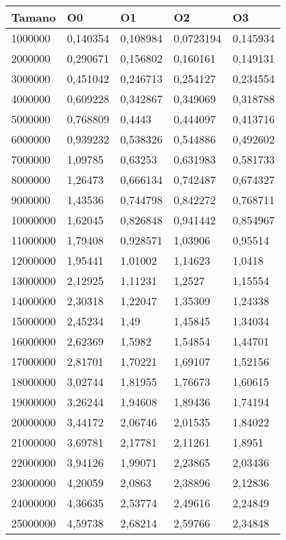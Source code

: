 \begin{tabular}{|l|l|l|l|l|}
	\hline
	Tamano & O0 & O1 & O2 & O3 \\
	\hline
	\hline
	1000000 & 0,140354 & 0,108984 & 0,0723194 & 0,145934 \\
	\hline
	2000000 & 0,290671 & 0,156802 & 0,160161 & 0,149131 \\
	\hline
	3000000 & 0,451042 & 0,246713 & 0,254127 & 0,234554 \\
	\hline
	4000000 & 0,609228 & 0,342867 & 0,349069 & 0,318788 \\
	\hline
	5000000 & 0,768809 & 0,4443 & 0,444097 & 0,413716 \\
	\hline
	6000000 & 0,939232 & 0,538326 & 0,544886 & 0,492602 \\
	\hline
	7000000 & 1,09785 & 0,63253 & 0,631983 & 0,581733 \\
	\hline
	8000000 & 1,26473 & 0,666134 & 0,742487 & 0,674327 \\
	\hline
	9000000 & 1,43536 & 0,744798 & 0,842272 & 0,768711 \\
	\hline
	10000000 & 1,62045 & 0,826848 & 0,941442 & 0,854967 \\
	\hline
	11000000 & 1,79408 & 0,928571 & 1,03906 & 0,95514 \\
	\hline
	12000000 & 1,95441 & 1,01002 & 1,14623 & 1,0418 \\
	\hline
	13000000 & 2,12925 & 1,11231 & 1,2527 & 1,15554 \\
	\hline
	14000000 & 2,30318 & 1,22047 & 1,35309 & 1,24338 \\
	\hline
	15000000 & 2,45234 & 1,49 & 1,45845 & 1,34034 \\
	\hline
	16000000 & 2,62369 & 1,5982 & 1,54854 & 1,44701 \\
	\hline
	17000000 & 2,81701 & 1,70221 & 1,69107 & 1,52156 \\
	\hline
	18000000 & 3,02744 & 1,81955 & 1,76673 & 1,60615 \\
	\hline
	19000000 & 3,26244 & 1,94608 & 1,89436 & 1,74194 \\
	\hline
	20000000 & 3,44172 & 2,06746 & 2,01535 & 1,84022 \\
	\hline
	21000000 & 3,69781 & 2,17781 & 2,11261 & 1,8951 \\
	\hline
	22000000 & 3,94126 & 1,99071 & 2,23865 & 2,03436 \\
	\hline
	23000000 & 4,20059 & 2,0863 & 2,38896 & 2,12836 \\
	\hline
	24000000 & 4,36635 & 2,53774 & 2,49616 & 2,24849 \\
	\hline
	25000000 & 4,59738 & 2,68214 & 2,59766 & 2,34848 \\
	\hline
\end{tabular}
